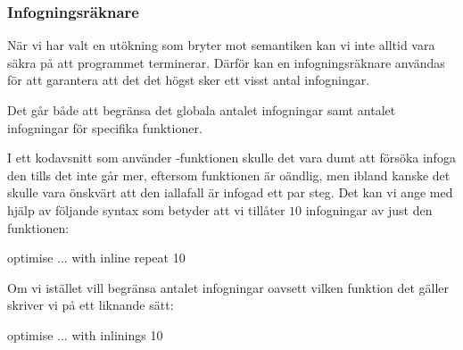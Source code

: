 \documentclass[../Optimise]{subfiles}
\begin{document}
\subsubsection{Infogningsräknare}
När vi har valt en utökning som bryter mot semantiken kan vi inte alltid vara säkra på
att programmet terminerar. Därför kan en infogningsräknare användas för att garantera
att det det högst sker ett visst antal infogningar.

Det går både att begränsa det globala antalet infogningar samt antalet infogningar för specifika funktioner.

I ett kodavsnitt som använder -funktionen skulle det vara dumt att
försöka infoga den tills det inte går mer, eftersom funktionen är oändlig,
men ibland kanske det skulle vara önskvärt att den iallafall är infogad ett par steg.
Det kan vi ange med hjälp av följande syntax som betyder att vi tillåter
$10$ infogningar av just den funktionen:

\begin{codeEx}
optimise ... with { inline repeat 10 }
\end{codeEx}

Om vi istället vill begränsa antalet infogningar oavsett vilken funktion det gäller
skriver vi på ett liknande sätt:

\begin{codeEx}
optimise ... with { inlinings 10 }
\end{codeEx}
\end{document}

